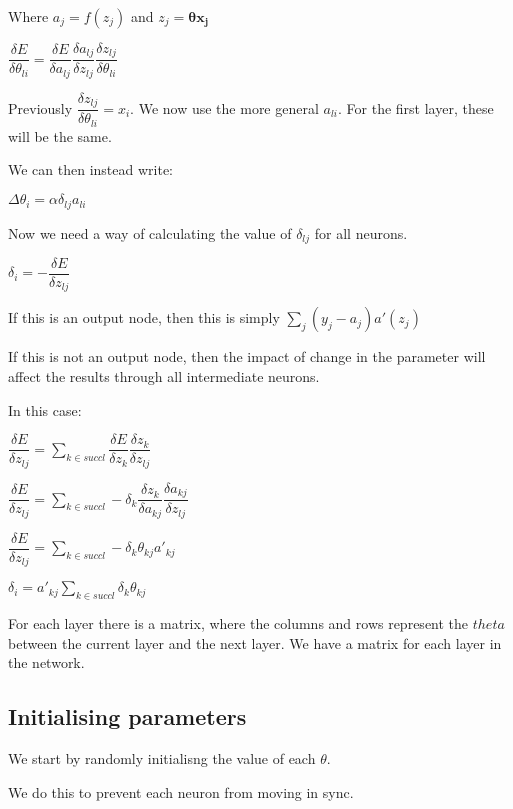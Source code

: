 Where \(a_j=f(z_j)\) and \(z_j=\boldsymbol{\theta x_j}\)

\(\dfrac{\delta E}{\delta \theta_{li}}=\dfrac{\delta E}{\delta a_{lj}}\dfrac{\delta a_{lj}}{\delta z_{lj}}\dfrac{\delta z_{lj}}{\delta \theta_{li}}\)

Previously \(\dfrac{\delta z_{lj}}{\delta \theta_{li}}=x_i\). We now use the more general \(a_{li}\). For the first layer, these will be the same.

We can then instead write:

\(\Delta \theta_i=\alpha \delta_{lj} a_{li}\)

Now we need a way of calculating the value of \(\delta_{lj}\) for all neurons.

\(\delta_i=-\dfrac{\delta E}{\delta z_{lj}}\)

If this is an output node, then this is simply \(\sum_j(y_j-a_j)a'(z_j)\)

If this is not an output node, then the impact of change in the parameter will affect the results through all intermediate neurons.

In this case:

\(\dfrac{\delta E}{\delta z_{lj}}=\sum_{k\in succ{l}}\dfrac{\delta E}{\delta z_{k}}\dfrac{\delta z_{k}}{\delta z_{lj}}\)

\(\dfrac{\delta E}{\delta z_{lj}}=\sum_{k\in succ{l}}-\delta_{k}\dfrac{\delta z_{k}}{\delta a_{kj}}\dfrac{\delta a_{kj}}{\delta z_{lj}}\)

\(\dfrac{\delta E}{\delta z_{lj}}=\sum_{k\in succ{l}}-\delta_{k}\theta_{kj}a'_{kj}\)

\(\delta_i=a'_{kj}\sum_{k\in succ{l}}\delta_{k}\theta_{kj}\)

For each layer there is a matrix, where the columns and rows represent the \(theta \) between the current layer and the next layer. We have a matrix for each layer in the network.

\subsection{Initialising parameters}

We start by randomly initialisng the value of each \(\theta \).

We do this to prevent each neuron from moving in sync.
